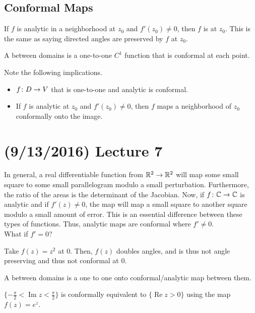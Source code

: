 \documentclass[11pt,leqno,oneside]{amsart}
\numberwithin{thm}{section}
\renewcommand{\Re}{\operatorname{Re}}
\renewcommand{\Im}{\operatorname{Im}}
\begin{document}
\subsection*{Conformal Maps}
\begin{defn}
    If $f$ is analytic in a neighborhood at $z_0$ and $f'(z_0) \neq 0$, then
    $f$ is  at $z_0$. This is the same as saying directed
    angles are preserved by $f$ at $z_0$.
\end{defn}
\begin{defn}
    A  between domains is a one-to-one $C^1$ function
    that is conformal at each point.
\end{defn}
Note the following implications.
\begin{itemize}
    \item $f\colon D \to V$ that is one-to-one and analytic is conformal.
    \item If $f$ is analytic at $z_0$ and $f'(z_0) \neq 0$, then $f$ maps a
        neighborhood of $z_0$ conformally onto the image.
\end{itemize}

\section{(9/13/2016) Lecture 7}
In general, a real differentiable function from ${\mathbb R}^2 \to {\mathbb R}^2$ will map some
small square to some small parallelogram modulo a small
perturbation. Furthermore, the ratio of the areas is the determinant of the
Jacobian. Now, if $f\colon {\mathbb C} \to {\mathbb C}$ is analytic and if $f'(z) \neq 0$, the map will
map a small square to another square modulo a small amount of error. This is an
essential difference between these types of functions. Thus, analytic maps are
conformal where $f' \neq 0$. \\

What if $f' = 0$?
\begin{example}
  Take $f(z) = z^2$ at 0. Then, $f(z)$ doubles angles, and is thus not angle
  preserving and thus not conformal at 0.
\end{example}

\begin{defn}
  A  between domains is a one to one onto
  conformal/analytic map between them.
\end{defn}
\begin{example}
  $\{-\frac{\pi}{2} < \Im z < \frac{\pi}{2}\}$ is conformally equivalent to
  $\{\Re z > 0\}$ using the map $f(z) = e^z$.
\end{example}
\end{document}
